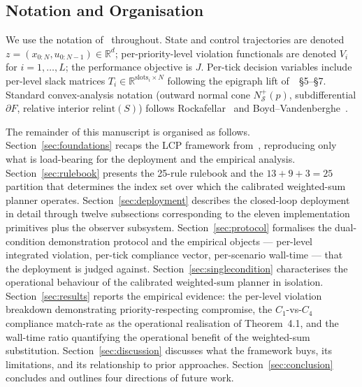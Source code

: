 \subsection{Notation and Organisation}
\label{sec:intro:notation}

We use the notation of~\cite{lcp2025} throughout. State and control trajectories are denoted $z = (x_{0:N}, u_{0:N-1}) \in \mathbb{R}^d$; per-priority-level violation functionals are denoted $V_i$ for $i = 1, \ldots, L$; the performance objective is $J$. Per-tick decision variables include per-level slack matrices $T_i \in \mathbb{R}^{\text{slots}_i \times N}$ following the epigraph lift of~\cite{lcp2025}~\S5--\S7. Standard convex-analysis notation (outward normal cone $N_{\mathcal{S}}^{+}(p)$, subdifferential $\partial F$, relative interior $\mathrm{relint}(S)$) follows Rockafellar~\cite{rockafellar1970convex} and Boyd--Vandenberghe~\cite{boyd2004convex}.

The remainder of this manuscript is organised as follows. Section~\ref{sec:foundations} recaps the LCP framework from~\cite{lcp2025}, reproducing only what is load-bearing for the deployment and the empirical analysis. Section~\ref{sec:rulebook} presents the 25-rule rulebook and the $13 + 9 + 3 = 25$ partition that determines the index set over which the calibrated weighted-sum planner operates. Section~\ref{sec:deployment} describes the closed-loop deployment in detail through twelve subsections corresponding to the eleven implementation primitives plus the observer subsystem. Section~\ref{sec:protocol} formalises the dual-condition demonstration protocol and the empirical objects --- per-level integrated violation, per-tick compliance vector, per-scenario wall-time --- that the deployment is judged against. Section~\ref{sec:singlecondition} characterises the operational behaviour of the calibrated weighted-sum planner in isolation. Section~\ref{sec:results} reports the empirical evidence: the per-level violation breakdown demonstrating priority-respecting compromise, the $C_1$-vs-$C_4$ compliance match-rate as the operational realisation of Theorem~4.1, and the wall-time ratio quantifying the operational benefit of the weighted-sum substitution. Section~\ref{sec:discussion} discusses what the framework buys, its limitations, and its relationship to prior approaches. Section~\ref{sec:conclusion} concludes and outlines four directions of future work.
